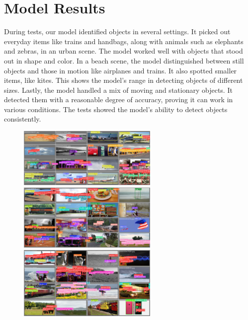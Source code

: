 \documentclass[10pt]{extarticle}
\begin{document}
\section{Model Results}

During tests, our model identified objects in several settings. It picked out everyday items like trains and handbags, along with animals such as elephants and zebras, in an urban scene. The model worked well with objects that stood out in shape and color. In a beach scene, the model distinguished between still objects and those in motion like airplanes and trains. It also spotted smaller items, like kites. This shows the model's range in detecting objects of different sizes. Lastly, the model handled a mix of moving and stationary objects. It detected them with a reasonable degree of accuracy, proving it can work in various conditions. The tests showed the model's ability to detect objects consistently.

\begin{figure}[H]
    \centering
    \includegraphics[width=0.6\textwidth]{images/val_batch0_pred.jpg}
    \\
    \includegraphics[width=0.6\textwidth]{images/val_batch1_pred.jpg}
    \\
    \includegraphics[width=0.6\textwidth]{images/val_batch2_pred.jpg}
    \label{fig:combined_environments}
\end{figure}
\end{document}
